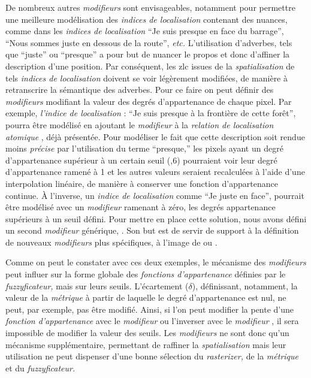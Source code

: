 De nombreux autres \emph{modifieurs} sont envisageables, notamment
pour permettre une meilleure modélisation des \emph{indices de
  localisation} contenant des nuances, comme dans les \emph{indices de
  localisation} \enquote{Je suis presque en face du barrage},
\enquote{Nous sommes juste en dessous de la route}, \emph{etc.}
L'utilisation d'adverbes, tels que \enquote{juste} ou
\enquote{presque} a pour but de nuancer le propos et donc d'affiner la
description d'une position. Par conséquent, les \ac{zlc} issues de la
\emph{spatialisation} de tels \emph{indices de localisation} doivent
se voir légèrement modifiées, de manière à retranscrire la sémantique
des adverbes. Pour ce faire on peut définir des \emph{modifieurs}
modifiant la valeur des degrés d'appartenance de chaque pixel. Par
exemple, \emph{l'indice de localisation} : \enquote{Je suis presque à
  la frontière de cette forêt}, pourra être modélisé en ajoutant le
\emph{modifieur}  à la \emph{relation de localisation
  atomique} , déjà présentée. Pour
modéliser le fait que cette description soit rendue moins
\emph{précise} par l'utilisation du terme \enquote{presque,} les
pixels ayant un degré d'appartenance supérieur à un certain seuil (,6) pourraient voir leur degré d'appartenance ramené à 1 et les
autres valeurs seraient recalculées à l'aide d'une interpolation
linéaire, de manière à conserver une fonction d'appartenance
continue. À l'inverse, un \emph{indice de localisation} comme
\enquote{Je juste en face}, pourrait être modélisé avec un
\emph{modifieur} ramenant à zéro, les degrés appartenance supérieurs à
un seuil défini. Pour mettre en place cette solution, nous avons
défini un second \emph{modifieur} générique, . Son
but est de servir de support à la définition de nouveaux
\emph{modifieurs} plus spécifiques, à l'image de  ou
.


Comme on peut le constater avec ces deux exemples, le mécanisme des
\emph{modifieurs} peut influer sur la forme globale des
\emph{fonctions d'appartenance} définies par le \emph{fuzzyficateur,}
mais sur leurs seuils. L'écartement (\(\delta\)), définissant,
notamment, la valeur de la \emph{métrique} à partir de laquelle le
degré d'appartenance est nul, ne peut, par exemple, pas être
modifié. Ainsi, si l'on peut modifier la pente d'une \emph{fonction
  d'appartenance} avec le \emph{modifieur}  ou
l'inverser avec le \emph{modifieur} , il sera impossible de
modifier la valeur des seuils. Les \emph{modifieurs} ne sont donc
qu'un mécanisme supplémentaire, permettant de raffiner la
\emph{spatialisation} mais leur utilisation ne peut dispenser d'une
bonne sélection du \emph{rasterizer,} de la \emph{métrique} et du
\emph{fuzzyficateur.}

